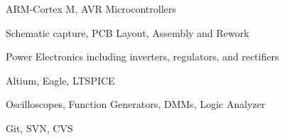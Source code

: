 \begin{cvskillscolumn}

                {\item ARM-Cortex M, AVR Microcontrollers
                 \item Schematic capture, PCB Layout, Assembly and Rework
                 \item Power Electronics including inverters, regulators, and rectifiers}
                {\item Altium, Eagle, LTSPICE
                 \item Oscilloscopes, Function Generators, DMMs, Logic Analyzer
                 \item Git, SVN, CVS}
\end{cvskillscolumn}
